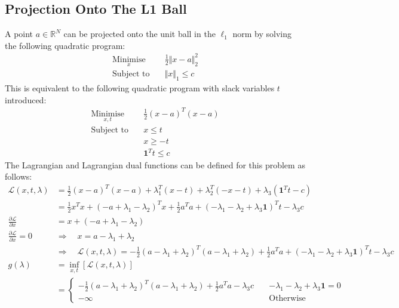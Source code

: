 \subsection{Projection Onto The L1 Ball}
A point $a \in \mathbb{R}^N$ can be projected onto the unit ball in the $\ell_1$ norm by solving the following quadratic program:
\begin{align*}
    \underset{x}{\text{Minimise}} \quad & \frac{1}{2}\Vert x - a \Vert_2^2 \\
    \text{Subject to} \quad & \Vert x \Vert_1 \le c
\end{align*}
This is equivalent to the following quadratic program with slack variables $t$ introduced:
\begin{align*}
    \underset{x,t}{\text{Minimise}} \quad & \frac{1}{2}(x - a)^T(x - a) \\
    \text{Subject to} \quad & x \le t \\
    & x \ge -t \\
    & \mathbf{1}^T t \le c
\end{align*}
The Lagrangian and Lagrangian dual functions can be defined for this problem as follows:
\begin{align*}
    \mathcal{L}(x, t, \lambda) &= \frac{1}{2}(x - a)^T(x - a) + \lambda_1^T(x - t) + \lambda_2^T(-x - t) + \lambda_3(\mathbf{1}^T t - c) \\
    &= \frac{1}{2}x^Tx + (-a + \lambda_1 - \lambda_2)^T x + \frac{1}{2}a^Ta + (-\lambda_1 - \lambda_2 + \lambda_3\mathbf{1})^Tt - \lambda_3c \\
    \frac{\partial\mathcal{L}}{\partial x} &= x + (-a + \lambda_1 - \lambda_2) \\
    \frac{\partial\mathcal{L}}{\partial x} = 0 \quad &\Rightarrow \quad x = a - \lambda_1 + \lambda_2 \\
    &\Rightarrow \quad \mathcal{L}(x, t, \lambda) = -\frac{1}{2}(a - \lambda_1 + \lambda_2)^T(a - \lambda_1 + \lambda_2) + \frac{1}{2}a^Ta + (-\lambda_1 - \lambda_2 + \lambda_3\mathbf{1})^Tt - \lambda_3c \\
    g(\lambda) &= \underset{x, t}{\inf}\left[\mathcal{L}(x, t, \lambda)\right] \\
    &= \begin{cases}
        -\frac{1}{2}(a - \lambda_1 + \lambda_2)^T(a - \lambda_1 + \lambda_2) + \frac{1}{2}a^Ta - \lambda_3c \quad & -\lambda_1 - \lambda_2 + \lambda_3\mathbf{1} = 0 \\
        -\infty & \text{Otherwise}
    \end{cases}
\end{align*}
